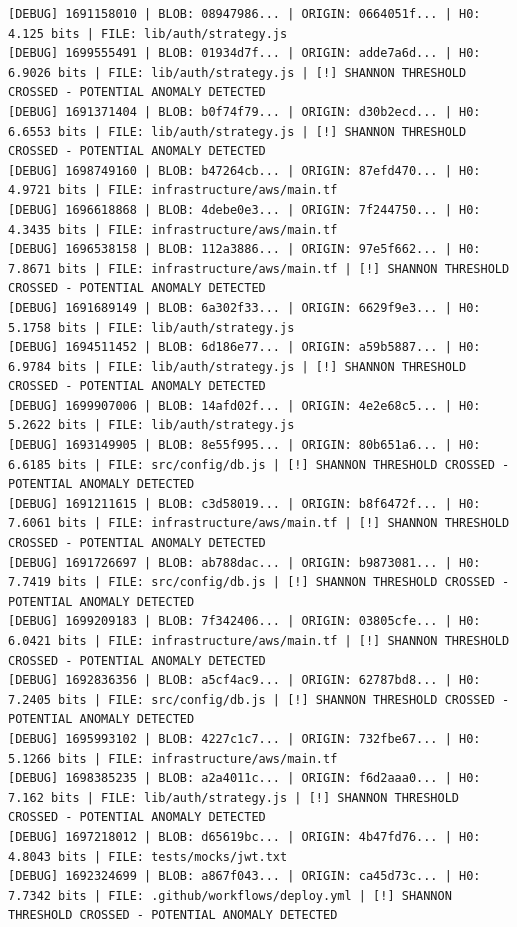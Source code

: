 \documentclass[12pt, a4paper, oneside]{report}
\begin{document}
\begin{lstlisting}[basicstyle=\tiny\ttfamily]
[DEBUG] 1691158010 | BLOB: 08947986... | ORIGIN: 0664051f... | H0: 4.125 bits | FILE: lib/auth/strategy.js
[DEBUG] 1699555491 | BLOB: 01934d7f... | ORIGIN: adde7a6d... | H0: 6.9026 bits | FILE: lib/auth/strategy.js | [!] SHANNON THRESHOLD CROSSED - POTENTIAL ANOMALY DETECTED
[DEBUG] 1691371404 | BLOB: b0f74f79... | ORIGIN: d30b2ecd... | H0: 6.6553 bits | FILE: lib/auth/strategy.js | [!] SHANNON THRESHOLD CROSSED - POTENTIAL ANOMALY DETECTED
[DEBUG] 1698749160 | BLOB: b47264cb... | ORIGIN: 87efd470... | H0: 4.9721 bits | FILE: infrastructure/aws/main.tf
[DEBUG] 1696618868 | BLOB: 4debe0e3... | ORIGIN: 7f244750... | H0: 4.3435 bits | FILE: infrastructure/aws/main.tf
[DEBUG] 1696538158 | BLOB: 112a3886... | ORIGIN: 97e5f662... | H0: 7.8671 bits | FILE: infrastructure/aws/main.tf | [!] SHANNON THRESHOLD CROSSED - POTENTIAL ANOMALY DETECTED
[DEBUG] 1691689149 | BLOB: 6a302f33... | ORIGIN: 6629f9e3... | H0: 5.1758 bits | FILE: lib/auth/strategy.js
[DEBUG] 1694511452 | BLOB: 6d186e77... | ORIGIN: a59b5887... | H0: 6.9784 bits | FILE: lib/auth/strategy.js | [!] SHANNON THRESHOLD CROSSED - POTENTIAL ANOMALY DETECTED
[DEBUG] 1699907006 | BLOB: 14afd02f... | ORIGIN: 4e2e68c5... | H0: 5.2622 bits | FILE: lib/auth/strategy.js
[DEBUG] 1693149905 | BLOB: 8e55f995... | ORIGIN: 80b651a6... | H0: 6.6185 bits | FILE: src/config/db.js | [!] SHANNON THRESHOLD CROSSED - POTENTIAL ANOMALY DETECTED
[DEBUG] 1691211615 | BLOB: c3d58019... | ORIGIN: b8f6472f... | H0: 7.6061 bits | FILE: infrastructure/aws/main.tf | [!] SHANNON THRESHOLD CROSSED - POTENTIAL ANOMALY DETECTED
[DEBUG] 1691726697 | BLOB: ab788dac... | ORIGIN: b9873081... | H0: 7.7419 bits | FILE: src/config/db.js | [!] SHANNON THRESHOLD CROSSED - POTENTIAL ANOMALY DETECTED
[DEBUG] 1699209183 | BLOB: 7f342406... | ORIGIN: 03805cfe... | H0: 6.0421 bits | FILE: infrastructure/aws/main.tf | [!] SHANNON THRESHOLD CROSSED - POTENTIAL ANOMALY DETECTED
[DEBUG] 1692836356 | BLOB: a5cf4ac9... | ORIGIN: 62787bd8... | H0: 7.2405 bits | FILE: src/config/db.js | [!] SHANNON THRESHOLD CROSSED - POTENTIAL ANOMALY DETECTED
[DEBUG] 1695993102 | BLOB: 4227c1c7... | ORIGIN: 732fbe67... | H0: 5.1266 bits | FILE: infrastructure/aws/main.tf
[DEBUG] 1698385235 | BLOB: a2a4011c... | ORIGIN: f6d2aaa0... | H0: 7.162 bits | FILE: lib/auth/strategy.js | [!] SHANNON THRESHOLD CROSSED - POTENTIAL ANOMALY DETECTED
[DEBUG] 1697218012 | BLOB: d65619bc... | ORIGIN: 4b47fd76... | H0: 4.8043 bits | FILE: tests/mocks/jwt.txt
[DEBUG] 1692324699 | BLOB: a867f043... | ORIGIN: ca45d73c... | H0: 7.7342 bits | FILE: .github/workflows/deploy.yml | [!] SHANNON THRESHOLD CROSSED - POTENTIAL ANOMALY DETECTED

\end{lstlisting}
\end{document}
